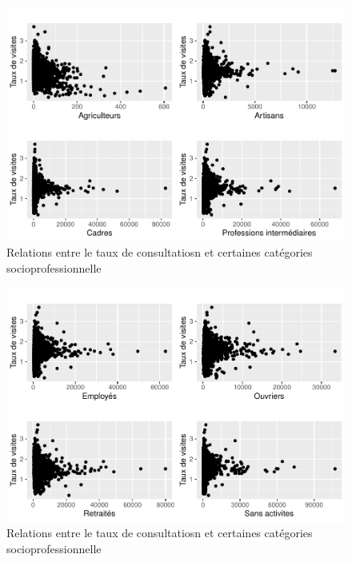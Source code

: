 \documentclass[
]{article}
\begin{document}
\begin{figure}

{\centering \includegraphics{4_Analyse_Descriptive_files/figure-latex/unnamed-chunk-10-1} 

}

\caption{Relations entre le taux de consultatiosn et certaines catégories socioprofessionnelle}\label{fig:unnamed-chunk-10-1}
\end{figure}
\begin{figure}

{\centering \includegraphics{4_Analyse_Descriptive_files/figure-latex/unnamed-chunk-10-2} 

}

\caption{Relations entre le taux de consultatiosn et certaines catégories socioprofessionnelle}\label{fig:unnamed-chunk-10-2}
\end{figure}
\end{document}
